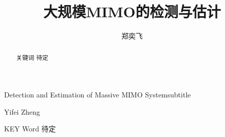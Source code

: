 \documentclass[bachelor,nocolorlinks, printoneside]{seuthesis} %
\begin{document}

\title{大规模MIMO的检测与估计}{}{Detection and Estimation of Massive MIMO System}{subtitle}
\author{郑奕飞}{Yifei Zheng}

\address{无线谷1405室}
\maketitle

\begin{abstract}{关键词}
待定
\end{abstract}

\begin{englishabstract}{KEY Word}
待定
\end{englishabstract}

\tableofcontents
\end{document}
